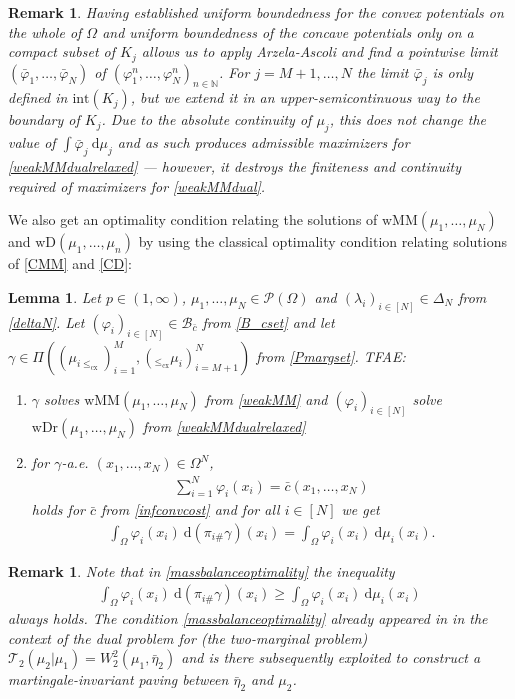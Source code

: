 \documentclass[10pt,a4paper]{amsart}
\newcommand{\NN}{\mathbb{N}}
\newcommand{\dd}{\mathrm{d}}
\newtheorem{lma}[thm]{Lemma}
\newtheorem{rmk}[thm]{Remark}
\begin{document}
\begin{rmk}
	Having established uniform boundedness for the convex potentials on the whole of $\Omega$ and uniform boundedness of the concave potentials only on a compact subset of $K_j$ allows us to apply Arzela-Ascoli and find a pointwise limit $(\bar\varphi_1,\dots,\bar\varphi_N)$ of $(\varphi_1^n,\dots,\varphi_N^n)_{n\in\NN}$. For $j=M+1,\dots,N$ the limit $\bar\varphi_j$ is only defined in $\text{int}(K_j)$, but we extend it in an upper-semicontinuous way to the boundary of $K_j$. Due to the absolute continuity of $\mu_j$, this does not change the value of $\int\bar\varphi_j\ \dd\mu_j$ and as such produces admissible maximizers for \eqref{weakMMdualrelaxed} --- however, it destroys the finiteness and continuity required of maximizers for \eqref{weakMMdual}.
\end{rmk}
We also get an optimality condition relating the solutions of $\text{wMM}(\mu_1,\dots,\mu_N)$ and $\text{wD}(\mu_1,\dots,\mu_n)$ by using the classical optimality condition relating solutions of \eqref{CMM} and \eqref{CD}:
\begin{lma}\label{weakMMoptimality}
	Let $p\in(1,\infty)$, $\mu_1,\dots,\mu_N\in\mathcal P(\Omega)$ and $(\lambda_i)_{i\in [N]}\in\Delta_N$ from \eqref{deltaN}.
	Let $(\varphi_{i})_{i\in[N]}\in\mathcal B_{\bar c}$ from \eqref{B_cset} and let $\gamma\in \Pi((\mu_{i\leq_{\text{cx}}})_{i=1}^M,(_{\leq_{\text{cx}}}\mu_i)_{i=M+1}^N)$ from \eqref{Pmargset}. TFAE:
	\begin{enumerate}
		\item $\gamma$ solves $\text{wMM}(\mu_1,\dots,\mu_N)$ from \eqref{weakMM} and $(\varphi_i)_{i\in[N]}$ solve $\text{wDr}(\mu_1,\dots,\mu_N)$ from \eqref{weakMMdualrelaxed}
		\item for $\gamma$-a.e. $(x_1,\dots,x_N)\in\Omega^N$,
		\begin{gather}\label{MMoptimality}
			\sum_{i=1}^N\varphi_i(x_i)=\bar c(x_1,\dots,x_N)
		\end{gather}
		holds for $\bar c$ from \eqref{infconvcost} and for all $i\in[N]$ we get
		\begin{gather}\label{massbalanceoptimality}
			\int_\Omega\varphi_i(x_i)\ \dd(\pi_{i\#}\gamma)(x_i)=\int_\Omega\varphi_i(x_i)\ \dd\mu_i(x_i).
		\end{gather}
	\end{enumerate}
\end{lma}
\begin{rmk}
	Note that in \eqref{massbalanceoptimality} the inequality
	\begin{gather*}
		\int_\Omega\varphi_i(x_i)\ \dd(\pi_{i\#}\gamma)(x_i)\geq\int_\Omega\varphi_i(x_i)\ \dd\mu_i(x_i)
	\end{gather*}
	always holds.
	The condition \eqref{massbalanceoptimality} already appeared in \cite[Lma 2]{gozlan2025} in the context of the dual problem for (the two-marginal problem) $\mathcal T_2(\mu_2|\mu_1)=W_2^2(\mu_1,\bar\eta_2)$ and is there subsequently exploited \cite[Sec 3]{gozlan2025} to construct a martingale-invariant paving between $\bar\eta_2$ and $\mu_2$.
\end{rmk}
\end{document}
